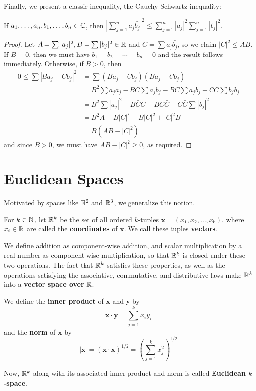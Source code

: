 Finally, we present a classic inequality, the Cauchy-Schwartz inequality:
\begin{theorem}
If $a_1, \dotsc, a_n, b_1, \dotsc, b_n \in \mathbb{C}$, then $\left| \sum_{j=1}^{n} a_j\bar{b_j} \right|^2 \le \sum_{j=1}^{n} |a_j|^2 \sum_{j=1}^{n} |b_j|^2$. 

\begin{proof}
Let $A = \sum |a_j|^2, B = \sum |b_j|^2 \in \mathbb{R}$ and $C = \sum a_j\bar{b_j}$, so we claim $|C|^2 \le AB$. If $B = 0$, then we must have $b_1 = b_2 = \dotsb = b_n = 0$ and the result follows immediately. Otherwise, if $B > 0$, then
\begin{align*}
0 \le \sum |B a_j - C b_j|^2 &= \sum (B a_j - C b_j)(B \bar{a_j} - \bar{C b_j}) \\
	&= B^2 \sum a_j \bar{a_j} - B\bar{C}\sum a_j \bar{b_j} - BC\sum \bar{a_j}b_j + C\bar{C} \sum b_j\bar{b_j} \\
	&= B^2 \sum|a_j|^2 - B\bar{C}C - BC\bar{C} + C\bar{C} \sum |b_j|^2 \\
	&= B^2 A - B|C|^2 - B|C|^2 + |C|^2 B \\
	&= B(AB - |C|^2)
\end{align*}
and since $B > 0$, we must have $AB - |C|^2 \ge 0$, as required. 
\end{proof}
\end{theorem}

\section{Euclidean Spaces}

Motivated by spaces like $\mathbb{R}^2$ and $\mathbb{R}^3$, we generalize this notion.
\begin{definition}
For $k \in \mathbb{N}$, let $\mathbb{R}^k$ be the set of all ordered $k$-tuples $\textbf{x} = (x_1, x_2, \dotsc, x_k)$, where $x_i \in \mathbb{R}$ are called the \textbf{coordinates} of $\textbf{x}$. We call these tuples \textbf{vectors}.

We define addition as component-wise addition, and scalar multiplication by a real number as component-wise multiplication, so that $\mathbb{R}^k$ is closed under these two operations. The fact that $\mathbb{R}^k$ satisfies these properties, as well as the operations satisfying the associative, commutative, and distributive laws make $\mathbb{R}^k$ into a \textbf{vector space over $\mathbb{R}$}.

We define the \textbf{inner product} of $\textbf{x}$ and $\textbf{y}$ by
\[
	\textbf{x} \cdot \textbf{y} = \sum_{j=1}^{k} x_i y_i
\]
and the \textbf{norm} of $\textbf{x}$ by
\[
	|\textbf{x}| = (\textbf{x} \cdot \textbf{x})^{1/2} = \left(\sum_{j=1}^{k} x_j^2 \right)^{1/2}
\]

Now, $\mathbb{R}^k$ along with its associated inner product and norm is called \textbf{Euclidean $k$-space}.
\end{definition}

